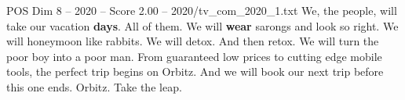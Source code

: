\begin{textsample}{POS Dim 8 – 2020 – Score 2.00 – 2020/tv\_com\_2020\_1.txt}  \label{ex:f8_pos_021}
We, the people, will take our vacation \textbf{days}.
All of them.
We will \textbf{wear} sarongs and look so right.
We will honeymoon like rabbits.
We will detox.
And then retox.
We will turn the poor boy into a poor man.
From guaranteed low prices to cutting edge mobile tools, the perfect trip begins on Orbitz.
And we will book our next trip before this one ends.
Orbitz.
Take the leap.

\end{textsample}
